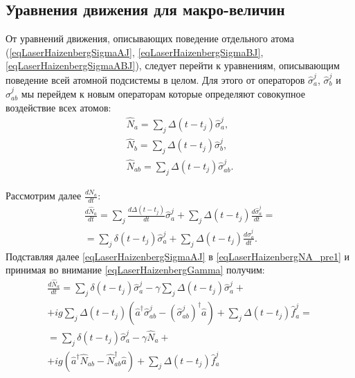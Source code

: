 \subsection{Уравнения движения для макро-величин}
От уравнений движения, описывающих поведение отдельного атома
(\ref{eqLaserHaizenbergSigmaAJ}, \ref{eqLaserHaizenbergSigmaBJ},
\ref{eqLaserHaizenbergSigmaABJ}), следует перейти к уравнениям,
описывающим поведение всей атомной подсистемы в целом. Для этого от
операторов $\hat{\sigma}^{j}_{a}$, $\hat{\sigma}^{j}_{b}$ и
$\hat{\sigma}^{j}_{ab}$ мы перейдем к новым операторам которые
определяют совокупное воздействие всех атомов:
\begin{eqnarray}
\hat{N}_{a} = \sum_j \Delta\left(t - t_j\right)\hat{\sigma}^{j}_{a}, 
\nonumber \\
\hat{N}_{b} = \sum_j \Delta\left(t - t_j\right)\hat{\sigma}^{j}_{b}, 
\nonumber \\
\hat{N}_{ab} = \sum_j \Delta\left(t - t_j\right)\hat{\sigma}^{j}_{ab}.
\label{eqLaserHaizenbergSigmaMacroDef}
\end{eqnarray}

Рассмотрим далее $\frac{d \hat{N}_{a}}{d t}$:
\begin{eqnarray}
\frac{d \hat{N}_{a}}{d t} = 
\sum_j \frac{d \Delta\left(t - t_j\right)}{d t}\hat{\sigma}^{j}_{a} +
\sum_j \Delta\left(t - t_j\right)\frac{d \hat{\sigma}^{j}_{a}}{d t} = 
\nonumber \\
= \sum_j \delta\left(t - t_j\right)\hat{\sigma}^{j}_{a} + \sum_j
\Delta\left(t - t_j\right)\frac{d \hat{\sigma}^{j}_{a}}{d t}. 
\label{eqLaserHaizenbergNA_pre1}
\end{eqnarray}
Подставляя далее \eqref{eqLaserHaizenbergSigmaAJ} в
\eqref{eqLaserHaizenbergNA_pre1} и принимая во внимание
\eqref{eqLaserHaizenbergGamma} получим:
\begin{eqnarray}
\frac{d \hat{N}_{a}}{d t} 
= \sum_j \delta\left(t - t_j\right)\hat{\sigma}^{j}_{a} - \gamma
\sum_j \Delta\left(t - t_j\right) \hat{\sigma}_{a}^{j} +
\nonumber \\
+
i g \sum_j
\Delta\left(t - t_j\right) 
 \left(
\hat{a}^{\dag}\hat{\sigma}^{j}_{ab} -
\left(\hat{\sigma}^{j}_{ab}\right)^{\dag}\hat{a}
\right) + \sum_j \Delta\left(t - t_j\right) \hat{f}_{a}^{j} = 
\nonumber \\
= 
\sum_j \delta\left(t - t_j\right)\hat{\sigma}^{j}_{a} - \gamma
\hat{N}_{a} + 
\nonumber \\ 
+ i g  \left(
\hat{a}^{\dag}\hat{N}_{ab} -
\hat{N}_{ab}^{\dag}\hat{a}
\right) + \sum_j \Delta\left(t - t_j\right) \hat{f}_{a}^{j}
\label{eqLaserHaizenbergNA_pre2}
\end{eqnarray}


